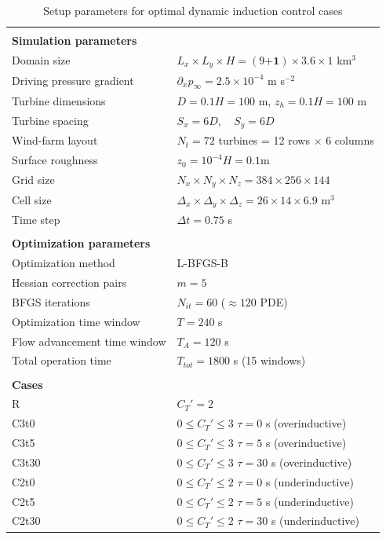 \begin{table}[t]	
	\caption{Setup parameters for optimal dynamic induction control cases}\label{tab:setup_params_ind}
	\centering
	\begin{tabular}{ll}
		\hline \\
		\textbf{Simulation parameters} & \\
		Domain size  & 			$L_x \times L_y \times H = (9 \boldsymbol{+1}) \times 3.6 \times 1$ km$^3$  \\ 
		Driving pressure gradient  & 	$ \partial_x p_\infty = 2.5 \times 10^{-4}$ m s$^{-2}$  \\ 
		Turbine dimensions  &  $D = 0.1H = 100$ m, \quad $z_h = 0.1H = 100$ m\\ 
		Turbine spacing  &  $S_x = 6D, \quad S_y = 6D$\\
		Wind-farm layout & $N_t = 72 $ turbines = 12 rows $\times$ 6 columns \\ 
		Surface roughness  &  $z_0 = 10^{-4}H = 0.1$m\\ 
		Grid size & $N_x \times N_y \times N_z = 384 \times 256 \times 144$\\
		Cell size & $\Delta_x \times \Delta_y \times \Delta_z = 26 \times 14 \times 6.9$ m$^3$\\
		Time step & $\Delta t = 0.75$ s\\		
		&\\
		\textbf{Optimization parameters} & \\ 
		Optimization method			& L-BFGS-B \\
		Hessian correction pairs 	& $m = 5$ \\
		BFGS iterations 			& $N_{it} = 60$ ($\approx 120$ PDE) \\
		Optimization time window					& $T = 240$ s\\
		Flow advancement time window & $T_A = 120$ s\\
		Total operation time         & $T_{tot} = 1800$ s (15 windows)\\
		&\\
		\textbf{Cases} & \\
		R			& $C_T' = 2$\\
		C3t0		& $0 \leq C_T' \leq 3$  \quad   $\tau = 0$ s (overinductive)\\
		C3t5		& $0 \leq C_T' \leq 3$  \quad   $\tau = 5$ s (overinductive)\\
		C3t30		& $0 \leq C_T' \leq 3$  \quad   $\tau = 30$ s (overinductive)\\
		C2t0		& $0 \leq C_T' \leq 2$  \quad   $\tau = 0$ s (underinductive)\\			C2t5		& $0 \leq C_T' \leq 2$  \quad   $\tau = 5$ s (underinductive)\\
		C2t30		& $0 \leq C_T' \leq 2$  \quad   $\tau = 30$ s (underinductive)\\		
		\hline 
	\end{tabular} 
\end{table}

